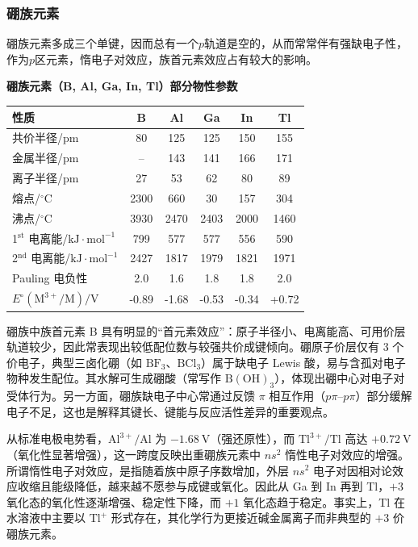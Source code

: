 \documentclass[UTF8]{ctexbook}
\begin{document}
\subsubsection{硼族元素}

硼族元素多成三个单键，因而总有一个$p$轨道是空的，从而常常伴有强缺电子性，作为$p$区元素，惰电子对效应，族首元素效应占有较大的影响。

\textbf{硼族元素（B, Al, Ga, In, Tl）部分物性参数}

\medskip
\renewcommand{\arraystretch}{1.2}
\noindent\begin{tabular*}{\textwidth}{@{\extracolsep{\fill}}lccccc@{}}
\toprule
性质 & B & Al & Ga & In & Tl \\
\midrule
共价半径/pm & 80 & 125 & 125 & 150 & 155 \\
金属半径/pm & -- & 143 & 141 & 166 & 171 \\
离子半径/pm & 27 & 53 & 62 & 80 & 89 \\
熔点/\(^{\circ}\mathrm{C}\) & 2300 & 660 & 30 & 157 & 304 \\
沸点/\(^{\circ}\mathrm{C}\) & 3930 & 2470 & 2403 & 2000 & 1460 \\
1$^{\mathrm{st}}$ 电离能/\(\mathrm{kJ\cdot mol^{-1}}\) & 799 & 577 & 577 & 556 & 590 \\
2$^{\mathrm{nd}}$ 电离能/\(\mathrm{kJ\cdot mol^{-1}}\) & 2427 & 1817 & 1979 & 1821 & 1971 \\
Pauling 电负性 & 2.0 & 1.6 & 1.8 & 1.8 & 2.0 \\
\(E^{\circ}(\mathrm{M^{3+}/M})/\mathrm{V}\) & -0.89 & -1.68 & -0.53 & -0.34 & +0.72 \\
\bottomrule
\end{tabular*}
\renewcommand{\arraystretch}{1.0}

硼族中族首元素 B 具有明显的“首元素效应”：原子半径小、电离能高、可用价层轨道较少，因此常表现出较低配位数与较强共价成键倾向。硼原子价层仅有 3 个价电子，典型三卤化硼（如 $\mathrm{BF_3}$、$\mathrm{BCl_3}$）属于缺电子 Lewis 酸，易与含孤对电子物种发生配位。其水解可生成硼酸（常写作 $\mathrm{B(OH)_3}$），体现出硼中心对电子对受体行为。另一方面，硼族缺电子中心常通过反馈 $\pi$ 相互作用（$p\pi$--$p\pi$）部分缓解电子不足，这也是解释其键长、键能与反应活性差异的重要观点。

从标准电极电势看，$\mathrm{Al^{3+}/Al}$ 为 $-1.68\ \mathrm{V}$（强还原性），而 $\mathrm{Tl^{3+}/Tl}$ 高达 $+0.72\ \mathrm{V}$（氧化性显著增强），这一跨度反映出重硼族元素中 $ns^2$ 惰性电子对效应的增强。所谓惰性电子对效应，是指随着族中原子序数增加，外层 $ns^2$ 电子对因相对论效应收缩且能级降低，越来越不愿参与成键或氧化。因此从 Ga 到 In 再到 Tl，$+3$ 氧化态的氧化性逐渐增强、稳定性下降，而 $+1$ 氧化态趋于稳定。事实上，Tl 在水溶液中主要以 $\mathrm{Tl^+}$ 形式存在，其化学行为更接近碱金属离子而非典型的 $+3$ 价硼族元素。
\end{document}
